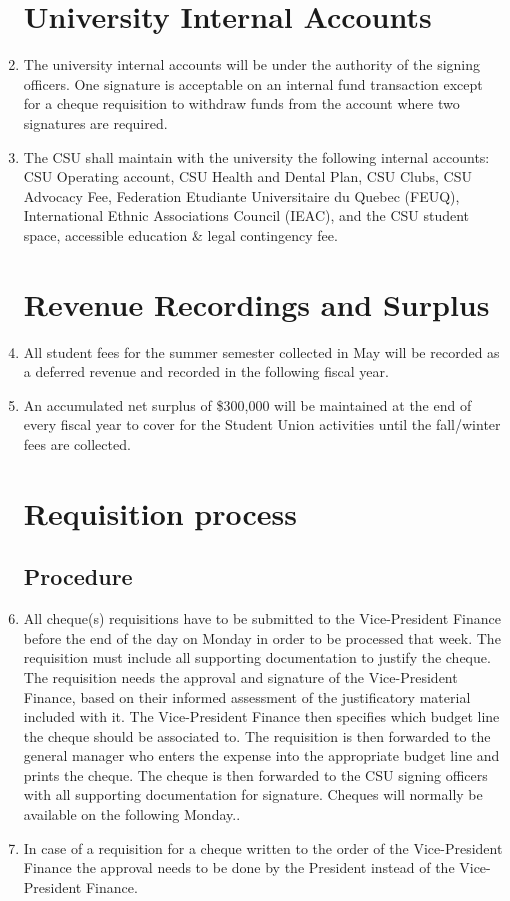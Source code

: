 \documentclass[oneside]{book}
\begin{document}
\begin{enumerate}
\chapter{\label{University_Internal_Accounts}University Internal Accounts }
\item The university internal accounts will be under the authority of the
signing officers. One signature is acceptable on an internal fund
transaction except for a cheque requisition to withdraw funds from
the account where two signatures are required. 
\item \label{enu:internal-accounts}The CSU shall maintain with the
university the following internal accounts: CSU Operating account, CSU Health and Dental Plan, CSU
Clubs, CSU Advocacy Fee, Federation Etudiante Universitaire du Quebec (FEUQ), International Ethnic
Associations Council (IEAC), and the CSU student space, accessible education \& legal contingency fee. 

\chapter{\label{Revenue_Recordings_and_Surplus}Revenue Recordings and Surplus }
\item All student fees for the summer semester collected in May will be
recorded as a deferred revenue and recorded in the following fiscal
year. 
\item An accumulated net surplus of \$300,000 will be maintained at the
end of every fiscal year to cover for the Student Union activities
until the fall/winter fees are collected. 

\chapter{\label{Requisition_process}Requisition process }


\section{\label{Procedure}Procedure }
\item All cheque(s) requisitions have to be submitted to the Vice-President
Finance before the end of the day on Monday in order to be processed
that week. The requisition
must include all supporting documentation to justify the cheque. 
The requisition needs the approval and signature of the
Vice-President Finance, based on their informed assessment of the justificatory 
material included with it. The Vice-President Finance then specifies
which budget line the cheque should be associated to. The
requisition is then forwarded to the general manager who enters the
expense into the appropriate budget line and prints the cheque. The
cheque is then forwarded to the CSU signing officers with all supporting
documentation for signature. Cheques will normally be available on
the following Monday.. 
\item In case of a requisition for a cheque written to the order of the
Vice-President Finance the approval needs to be done by the President
instead of the Vice-President Finance. 


\end{enumerate}
\end{document}
